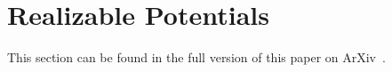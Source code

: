 \documentclass[a4paper,UKenglish]{lipics-v2016}
\begin{document}









\appendix
%

%
\section{Realizable Potentials}
\label{sec:realizable}
This section can be found in the full version of this paper on ArXiv~\cite{PanigrahyRSZ17}.




%



%
\end{document}
